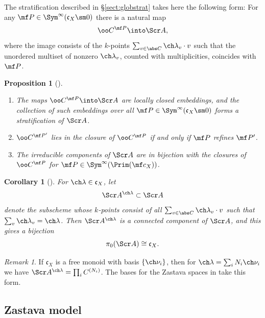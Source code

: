\documentclass[final]{amsart}
\newtheorem{prop}[subsubsection]{Proposition}
\newtheorem{cor}[subsubsection]{Corollary}
\theoremstyle{remark}
\newtheorem{rem}[subsubsection]{Remark}
\theoremstyle{definition}
\numberwithin{equation}{section}
\begin{document}
\subsubsection{} 
The stratification described in \S \ref{sect:globstrat} takes here the following form:
For any $\mf P \in \Sym^\infty(\mathfrak c_X\sm 0)$ there is a natural map 
\[ \oo C^{\mf P} \into \Scr A, \] 
where the image consists of the $k$-points $\sum_{v\in \abs C} \ch\lambda_v\cdot v$ such that the unordered multiset of nonzero $\ch\lambda_v$, counted
with multiplicities, coincides with $\mf P$. 



\begin{prop}[{\cite[Proposition 3.5]{BNS}}] 
\label{prop:Astrata}
\ 
\begin{enumerate}
\item The maps $\oo C^{\mf P}\into \Scr A$ are locally closed embeddings,
and the collection of such embeddings over all $\mf P\in \Sym^\infty(\mathfrak c_X \sm 0)$ forms a stratification of $\Scr A$.
\item $\oo C^{\mf P'}$ lies in the closure of $\oo C^{\mf P}$
if and only if $\mf P$ refines $\mf P'$. 
\item The irreducible components of $\Scr A$ are in bijection with 
the closures of $\oo C^{\mf P}$ for $\mf P \in \Sym^\infty(\Prim(\mf c_X))$.
\end{enumerate}
\end{prop}

\begin{cor}[{\cite[Corollary 3.6]{BNS}}] 
For $\ch\lambda \in \mathfrak c_X$, let 
\[ \Scr A^{\ch\lambda} \subset \Scr A \]
denote the subscheme whose $k$-points consist of all 
$\sum_{v\in \abs C} \ch\lambda_v \cdot v$
such that $\sum_v \ch\lambda_v = \ch\lambda$. 
Then $\Scr A^{\ch\lambda}$ is a connected component of $\Scr A$, and
this gives a bijection 
\[ \pi_0(\Scr A) \cong \mathfrak c_X. \] 
\end{cor}

\begin{rem}\label{rem:Afree}
If $\mathfrak c_X$ is a free monoid with basis $\{ \ch\nu_i \}$, 
then for $\ch\lambda = \sum_i N_i \ch\nu_i$ we have 
$\Scr A^{\ch\lambda} = \prod_i C^{(N_i)}$. The bases for the Zastava spaces
in \cite[\S 2.1]{BFGM} take this form.
\end{rem}



\subsection{Zastava model} \label{sect:localmodel}
\end{document}
